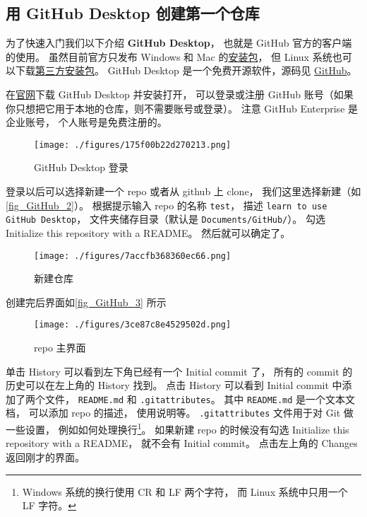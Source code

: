 \subsection{用 GitHub Desktop 创建第一个仓库}
为了快速入门我们以下介绍 \textbf{GitHub Desktop}， 也就是 GitHub 官方的客户端的使用。 虽然目前官方只发布 Windows 和 Mac 的\href{https://desktop.github.com/}{安装包}， 但 Linux 系统也可以下载\href{https://github.com/shiftkey/desktop/releases}{第三方安装包}。 GitHub Desktop 是一个免费开源软件，源码见 \href{https://github.com/desktop/desktop}{GitHub}。

在\href{https://desktop.github.com/}{官网}下载 GitHub Desktop 并安装打开， 可以登录或注册 GitHub 账号（如果你只想把它用于本地的仓库，则不需要账号或登录）。 注意 GitHub Enterprise 是企业账号， 个人账号是免费注册的。 %

\begin{figure}[ht]
\centering
\texttt{[image: ./figures/175f00b22d270213.png]}
\caption{GitHub Desktop 登录} \label{fig_GitHub_1}
\end{figure}

登录以后可以选择新建一个 repo 或者从 github 上 clone， 我们这里选择新建（如\autoref{fig_GitHub_2}）。 根据提示输入 repo 的名称 \verb|test|， 描述 \verb|learn to use GitHub Desktop|， 文件夹储存目录（默认是 \verb|Documents/GitHub/|）。 勾选 Initialize this repository with a README。 然后就可以确定了。

\begin{figure}[ht]
\centering
\texttt{[image: ./figures/7accfb368360ec66.png]}
\caption{新建仓库} \label{fig_GitHub_2}
\end{figure}

创建完后界面如\autoref{fig_GitHub_3} 所示
\begin{figure}[ht]
\centering
\texttt{[image: ./figures/3ce87c8e4529502d.png]}
\caption{repo 主界面} \label{fig_GitHub_3}
\end{figure}

单击 History 可以看到左下角已经有一个 Initial commit 了， 所有的 commit 的历史可以在左上角的 History 找到。 点击 History 可以看到 Initial commit 中添加了两个文件， \verb|README.md| 和 \verb|.gitattributes|。 其中 \verb|README.md| 是一个文本文档， 可以添加 repo 的描述， 使用说明等。 \verb|.gitattributes| 文件用于对 Git 做一些设置， 例如如何处理换行\footnote{Windows 系统的换行使用 CR 和 LF 两个字符， 而 Linux 系统中只用一个 LF 字符。}。 如果新建 repo 的时候没有勾选 Initialize this repository with a README， 就不会有 Initial commit。 点击左上角的 Changes 返回刚才的界面。

